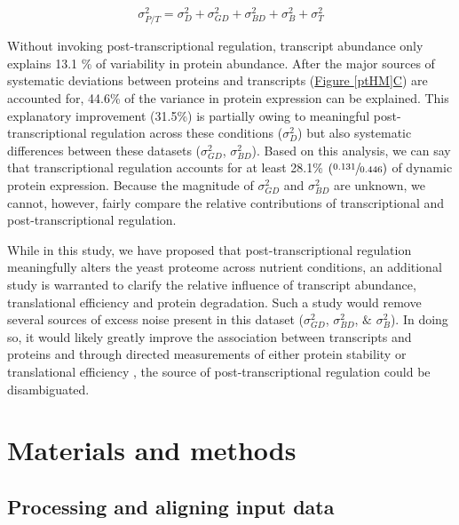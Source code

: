 \begin{equation}
\sigma^{2}_{P/T} = \sigma^{2}_{D} + \sigma^{2}_{GD} + \sigma^{2}_{BD} + \sigma^{2}_{B} + \sigma^{2}_{T}\label{eq:sources_of_ptvar}
\end{equation}

Without invoking post-transcriptional regulation, transcript abundance only explains 13.1 \% of variability in protein abundance. After the major sources of systematic deviations between proteins and transcripts (\hyperref[ptHM]{Figure \ref{ptHM}C}) are accounted for, 44.6\% of the variance in protein expression can be explained. This explanatory improvement (31.5\%) is partially owing to meaningful post-transcriptional regulation across these conditions ($\sigma^{2}_{D}$) but also systematic differences between these datasets ($\sigma^{2}_{GD}$, $\sigma^{2}_{BD}$). Based on this analysis, we can say that transcriptional regulation accounts for at least 28.1\% $\left(\sfrac{0.131}{0.446}\right)$ of dynamic protein expression. Because the magnitude of $\sigma^{2}_{GD}$ and $\sigma^{2}_{BD}$ are unknown, we cannot, however, fairly compare the relative contributions of transcriptional and post-transcriptional regulation.

While in this study, we have proposed that post-transcriptional regulation meaningfully alters the yeast proteome across nutrient conditions, an additional study is warranted to clarify the relative influence of transcript abundance, translational efficiency and protein degradation. Such a study would remove several sources of excess noise present in this dataset ($\sigma^{2}_{GD}$, $\sigma^{2}_{BD}$, $\&$ $\sigma^{2}_{B}$). In doing so, it would likely greatly improve the association between transcripts and proteins and through directed measurements of either protein stability or translational efficiency \cite{Belle:2006hv, Ingolia:2009dp}, the source of post-transcriptional regulation could be disambiguated.

\section{Materials and methods}

\subsection*{Processing and aligning input data}

